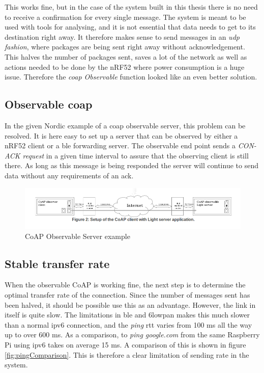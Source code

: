 This works fine, but in the case of the system built in this thesis there is no need to receive a confirmation for every single message. The system is meant to be used with tools for analysing, and it is not essential that data needs to get to its destination right away. It therefore makes sense to send messages in an \textit{\gls{udp} fashion}, where packages are being sent right away without acknowledgement. This halves the number of packages sent, saves a lot of the network as well as actions needed to be done by the nRF52 where power consumption is a huge issue. Therefore the \textit{\gls{coap} Observable} function looked like an even better solution.   

\subsection{Observable \gls{coap}}

In the given Nordic example of a \gls{coap} observable server, this problem can be resolved. It is here easy to set up a server that can be observed by either a nRF52 client or a \gls{ble} forwarding server. The observable end point sends a \textit{CON-ACK request} in a given time interval to assure that the observing client is still there. As long as this message is being responded the server will continue to send data without any requirements of an \gls{ack}. 

\begin{figure}[h]
    \centering
    \includegraphics[scale=0.47]{CoAPObservalbFigure2.png}    
    \caption{CoAP Observable Server example}
    \label{fig:CoAPexample1}
\end{figure}



\subsection{Stable transfer rate}

When the observable CoAP is working fine, the next step is to determine the optimal transfer rate of the connection. Since the number of messages sent has been halved, it should be possible use this as an advantage. However, the link in itself is quite slow. The limitations in \gls{ble} and \gls{6lowpan} makes this much slower than a normal \gls{ipv6} connection, and the \textit{ping} \gls{rtt} varies from 100 ms all the way up to over 600 ms. As a comparison, to \textit{ping google.com} from the same Raspberry Pi using \gls{ipv6} takes on average 15 ms. A comparison of this is shown in figure \ref{fig:pingComparison}. This is therefore a clear limitation of sending rate in the system. 

